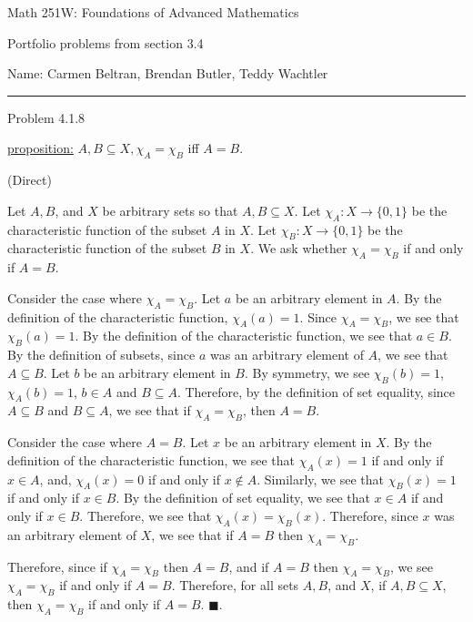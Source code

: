 \documentclass{article}
\theoremstyle{definition}
\renewcommand{\qed}{\blacksquare}
\begin{document}
	\begin{center}
		\Large{Math 251W: Foundations of Advanced Mathematics}

		\normalsize Portfolio problems from section 3.4

		\hfill Name: Carmen Beltran, Brendan Butler, Teddy Wachtler
		\hrule
		\vspace{0.4cm}
		\vspace{0.75cm}
	\end{center}


	\vspace{1cm}
	\noindent Problem 4.1.8
	\vspace{0.3cm}

	\underline{proposition:}
	$A, B\subseteq X, \chi_A = \chi_B$ iff $A = B$.

	\vspace{.2cm}
	 (Direct)
	\vspace{.15cm}

	Let $A, B$, and $X$ be arbitrary sets so that $A, B \subseteq X$.
	Let $\chi_A : X \rightarrow \{0, 1\}$ be the characteristic function of the subset $A$ in $X$.
	Let $\chi_B : X \rightarrow \{0, 1\}$ be the characteristic function of the subset $B$ in $X$.
	We ask whether $\chi_A = \chi_B$ if and only if $A = B$.

	Consider the case where $\chi_A = \chi_B$.
	Let $a$ be an arbitrary element in $A$.
	By the definition of the characteristic function, $\chi_A(a) = 1$.
	Since $\chi_A = \chi_B$, we see that $\chi_B(a) = 1$.
	By the definition of the characteristic function, we see that $a \in B$.
	By the definition of subsets, since $a$ was an arbitrary element of $A$, we see that $A \subseteq B$.
	Let $b$ be an arbitrary element in $B$.
	By symmetry, we see $\chi_B(b) = 1$, $\chi_A(b) = 1$, $b \in A$ and $B \subseteq A$.
	Therefore, by the definition of set equality, since $A \subseteq B$ and $B \subseteq A$, we see that if $\chi_A = \chi_B$, then $A = B$.

	Consider the case where $A = B$.
	Let $x$ be an arbitrary element in $X$.
	By the definition of the characteristic function, we see that $\chi_A(x) = 1$ if and only if $x \in A$, and, $\chi_A(x) = 0$ if and only if $x \not \in A$.
	Similarly, we see that $\chi_B(x) = 1$ if and only if $x \in B$.
	By the definition of set equality, we see that $x \in A$ if and only if $x \in B$.
	Therefore, we see that $\chi_A(x) = \chi_B(x)$.
	Therefore, since $x$ was an arbitrary element of $X$, we see that if $A = B$ then $\chi_A = \chi_B$.

	Therefore, since if $\chi_A = \chi_B$ then $A = B$, and if $A = B$ then $\chi_A = \chi_B$, we see $\chi_A = \chi_B$ if and only if $A = B$.
	Therefore, for all sets $A, B$, and $X$, if $A, B \subseteq X$, then $\chi_A = \chi_B$ if and only if $A = B$.
	$\qed$.

	\vspace{1cm}

\end{document}

